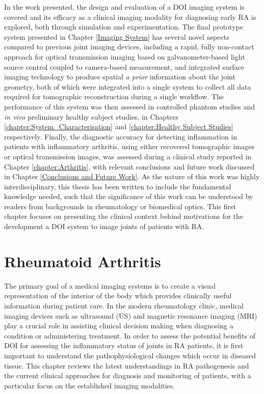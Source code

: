 \documentclass[twoside]{bhamthesis}
\theoremstyle{definition}
\begin{document}
In the work presented, the design and evaluation of a DOI imaging system is covered and its efficacy as a clinical imaging modality for diagnosing early RA is explored, both through simulation and experimentation. The final prototype system presented in Chapter \ref{Imaging System} has several novel aspects compared to previous joint imaging devices, including a rapid, fully non-contact approach for optical transmission imaging based on galvanometer-based light source control coupled to camera-based measurement, and integrated surface imaging technology to produce spatial \textit{a prior} information about the joint geometry, both of which were integrated into a single system to collect all data required for tomographic reconstruction during a single workflow. The performance of this system was then assessed in controlled phantom studies and \textit{in vivo} preliminary healthy subject studies, in Chapters \ref{chapter:System_Characterisation} and 
\ref{chapter:Healthy Subject Studies} respectively. Finally, the diagnostic accuracy for detecting inflammation in patients with inflammatory arthritis, using either recovered tomographic images or optical transmission images, was assessed during a clinical study reported in Chapter \ref{chapter:Arthritis}, with relevant conclusions and future work discussed in Chapter \ref{Conclusions and Future Work}. As the nature of this work was highly interdisciplinary, this thesis has been written to include the fundamental knowledge needed, such that the significance of this work can be understood by readers from backgrounds in rheumatology or biomedical optics. This first chapter focuses on presenting the clinical context behind motivations for the development a DOI system to image joints of patients with RA.


 \section{Rheumatoid Arthritis}

The primary goal of a medical imaging systems is to create a visual representation of the interior of the body which provides clinically useful information during patient care. In the modern rheumatology clinic, medical imaging devices such as ultrasound (US) and magnetic resonance imaging (MRI) play a crucial role in assisting clinical decision making when diagnosing a condition or administering treatment. In order to assess the potential benefits of DOI for assessing the inflammatory status of joints in RA patients, it is first important to understand the pathophysiological changes which occur in diseased tissue. This chapter reviews the latest understandings in RA pathogenesis and the current clinical approaches for diagnosis and monitoring of patients, with a particular focus on the established imaging modalities.
\end{document}
